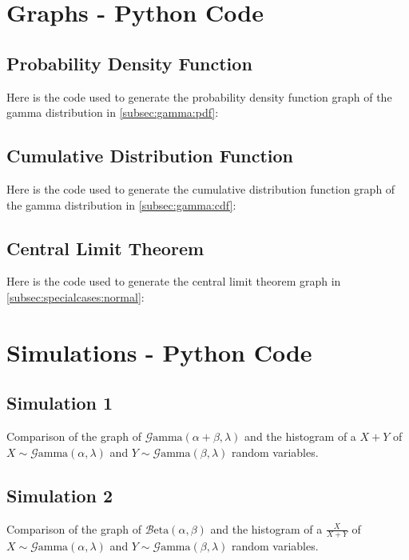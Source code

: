 \documentclass[12pt]{article}
\newcommand{\B}{\mathcal{B}}
\newcommand{\G}{\mathcal{G}}
\begin{document}
\begin{appendix}
\section{Graphs - Python Code}
\subsection{Probability Density Function}
Here is the code used to generate the probability density function graph of the gamma distribution in
\autoref{subsec:gamma:pdf}:


\pagebreak
\subsection{Cumulative Distribution Function}
Here is the code used to generate the cumulative distribution function graph of the gamma distribution in
\autoref{subsec:gamma:cdf}:


\pagebreak
\subsection{Central Limit Theorem}
Here is the code used to generate the central limit theorem graph in \autoref{subsec:specialcases:normal}:


\pagebreak
\section{Simulations - Python Code}
\subsection{Simulation 1 }
Comparison of the graph of $\G\text{amma}(\alpha+\beta, \lambda)$ and the histogram of a $X+Y$ of
$X\sim\G\text{amma}(\alpha, \lambda)$ and $Y\sim\G\text{amma}(\beta, \lambda)$ random variables.


\pagebreak
\subsection{Simulation 2 }
Comparison of the graph of $\B\text{eta}(\alpha, \beta)$ and the histogram of a $\frac{X}{X+Y}$ of
$X\sim\G\text{amma}(\alpha, \lambda)$ and $Y\sim\G\text{amma}(\beta, \lambda)$ random variables.


\pagebreak
{}\listoffigures
\end{appendix}

\pagebreak{}\printbibliography[heading=bibintoc, title={References}]
\end{document}
